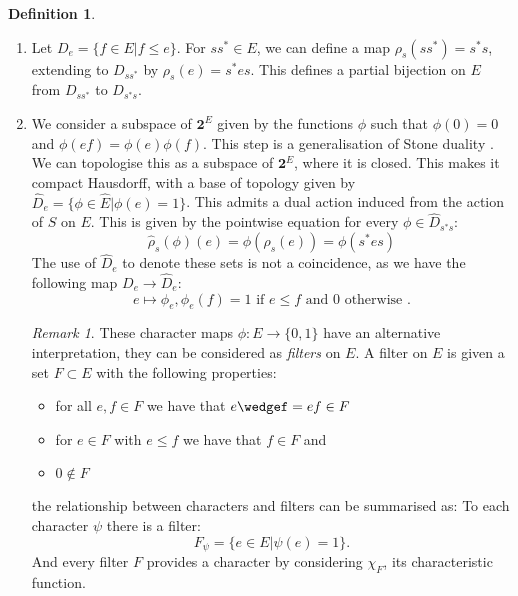 \documentclass[11pt,]{amsbook}
\theoremstyle{plain}
\theoremstyle{definition}%
\newtheorem{definition}[theorem]{Definition}%
\theoremstyle{remark}%
\newtheorem{remark}[theorem]{Remark}%
\newcommand{\E}{\widehat{E}}
\begin{document}
\begin{definition}

\begin{enumerate}
\item Let $D_{e}=\lbrace f \in E | f \leq e \rbrace$. For $ss^{*} \in E$, we can define a map $\rho_{s}(ss^{*})=s^{*}s$, extending to $D_{ss^{*}}$ by $\rho_{s}(e) = s^{*}es$. This defines a partial bijection on $E$ from $D_{ss^{*}}$ to $D_{s^{*}s}$. 

\item We consider a subspace of $\textbf{2}^{E}$ given by the functions $\phi$ such that $\phi(0)=0$ and $\phi(ef)=\phi(e)\phi(f)$. This step is a generalisation of Stone duality \cite{Lawson-2010}. We can topologise this as a subspace of $\textbf{2}^{E}$, where it is closed. This makes it compact Hausdorff, with a base of topology given by $\widehat{D}_{e}= \lbrace \phi \in \E | \phi(e)=1 \rbrace$. This admits a dual action induced from the action of $S$ on $E$. This is given by the pointwise equation for every $\phi \in \widehat{D}_{s^{*}s}$:
\begin{equation*}
\widehat{\rho}_{s}(\phi)(e)=\phi(\rho_{s}(e))=\phi(s^{*}es)
\end{equation*}
The use of $\widehat{D}_{e}$ to denote these sets is not a coincidence, as we have the following map $D_{e} \rightarrow \widehat{D}_{e}$:
\begin{equation*}
e \mapsto \phi_{e}, \phi_{e}(f)=1 \mbox{ if } e \leq f \mbox{ and } 0 \mbox{ otherwise }.
\end{equation*}
\begin{remark}
These character maps $\phi: E \rightarrow \lbrace 0,1 \rbrace$ have an alternative interpretation, they can be considered as \textit{filters} on $E$. A filter on $E$ is given  a set $F \subset E$ with the following properties:
\begin{itemize}
\item for all $e,f \in F$ we have that $e\wedgef=ef \in F$
\item for $e\in F$ with $e \leq f$ we have that $f \in F$ and
\item $0 \not\in F$
\end{itemize}
the relationship between characters and filters can be summarised as: To each character $\psi$ there is a filter:
\begin{equation*}
F_{\psi}= \lbrace e \in E | \psi(e)=1 \rbrace.
\end{equation*}
And every filter $F$ provides a character by considering $\chi_{F}$, its characteristic function.
\end{remark}


\end{enumerate}
\end{definition}
\end{document}

